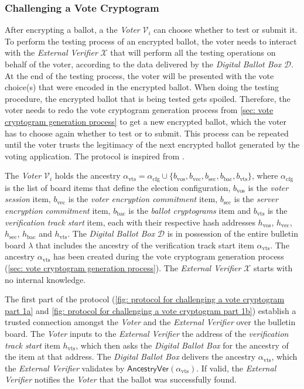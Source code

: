 \clearpage
\subsubsection{Challenging a Vote Cryptogram} \label{sec: challenging a vote cryptogram}
After encrypting a ballot, a the \textit{Voter} $\mathcal{V}_i$ can choose whether to test or submit it. To perform the testing process of an encrypted ballot, the voter needs to interact with the \textit{External Verifier} $\mathcal{X}$ that will perform all the testing operations on behalf of the voter, according to the data delivered by the \textit{Digital Ballot Box} $\mathcal{D}$. At the end of the testing process, the voter will be presented with the vote choice(s) that were encoded in the encrypted ballot. When doing the testing procedure, the encrypted ballot that is being tested gets spoiled. Therefore, the voter needs to redo the vote cryptogram generation process from \cref{sec: vote cryptogram generation process} to get a new encrypted ballot, which the voter has to choose again whether to test or to submit. This process can be repeated until the voter trusts the legitimacy of the next encrypted ballot generated by the voting application. The protocol is inspired from \cite{Benaloh06}.

The \textit{Voter} $\mathcal{V}_i$ holds the ancestry $\alpha_\mathrm{vts} = \alpha_\mathrm{cfg} \cup \{ b_\mathrm{vos}, b_\mathrm{vec}, b_\mathrm{sec}, b_\mathrm{bac}, b_\mathrm{vts} \}$, where $\alpha_\mathrm{cfg}$ is the list of board items that define the election configuration, $b_\mathrm{vos}$ is the \textit{voter session} item, $b_\mathrm{vec}$ is the \textit{voter encryption commitment} item, $b_\mathrm{sec}$ is the \textit{server encryption commitment} item, $b_\mathrm{bac}$ is the \textit{ballot cryptograms} item and $b_\mathrm{vts}$ is the \textit{verification track start} item, each with their respective hash addresses $h_\mathrm{vos}$, $h_\mathrm{vec}$, $h_\mathrm{sec}$, $h_\mathrm{bac}$ and $h_\mathrm{vts}$. The \textit{Digital Ballot Box} $\mathcal{D}$ is in possession of the entire bulletin board $\lambda$ that includes the ancestry of the verification track start item $\alpha_\mathrm{vts}$. The ancestry $\alpha_\mathrm{vts}$ has been created during the vote cryptogram generation process (\cref{sec: vote cryptogram generation process}). The \textit{External Verifier} $\mathcal{X}$ starts with no internal knowledge.

The first part of the protocol (\cref{fig: protocol for challenging a vote cryptogram part 1a} and \cref{fig: protocol for challenging a vote cryptogram part 1b}) establish a trusted connection amongst the \textit{Voter} and the \textit{External Verifier} over the bulletin board. The \textit{Voter} inputs to the \textit{External Verifier} the address of the \textit{verification track start} item $h_\mathrm{vts}$, which then asks the \textit{Digital Ballot Box} for the ancestry of the item at that address. The \textit{Digital Ballot Box} delivers the ancestry $\alpha_\mathrm{vts}$, which the \textit{External Verifier} validates by $\mathsf{AncestryVer}(\alpha_\mathrm{vts})$. If valid, the \textit{External Verifier} notifies the \textit{Voter} that the ballot was successfully found.

